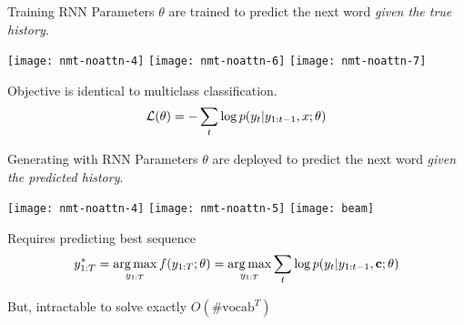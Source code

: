 \begin{frame}{Training RNN}
  Parameters $\theta$ are trained to predict the next word \textit{given the true history.}

  \begin{center}
  \texttt{[image: nmt-noattn-4]}
  \texttt{[image: nmt-noattn-6]}
  \texttt{[image: nmt-noattn-7]}
  \end{center}
  \pause

  Objective is identical to \textcolor{redpurple}{multiclass classification}.
  \[ {\cal L}(\theta) = -\sum_{t} \log p(y_t |  y_{1:t-1}, x; \theta) \]
\end{frame}

\begin{frame}{Generating with RNN}
  Parameters $\theta$ are deployed to predict the next word \textit{given the predicted history}.


  \begin{center}
  \texttt{[image: nmt-noattn-4]}
  \texttt{[image: nmt-noattn-5]}
  \texttt{[image: beam]}
  \end{center}

  Requires  predicting best sequence
  \[ y^*_{1:T} = \argmax_{y_{1:T}} f(y_{1:T}; \theta) = \argmax_{y_{1:T}} \sum_{t} \log p(y_{t} | y_{1:t-1}, \cvec; \theta) \]

  But, intractable to solve exactly $O(\text{\#vocab} ^T)$

\end{frame}

